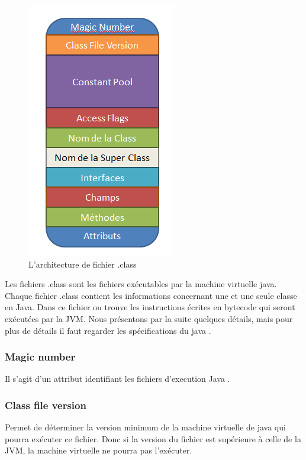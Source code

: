 \documentclass[12pt, a4paper, one side]{article}
\begin{document}
    \begin{figure}[h]
        \centering
        \includegraphics[scale=0.80]{JavaInternal.png}
        \caption{L'architecture de fichier .class \cite{ref_DexFormatvsJavabytecode}}
        \label{fig1}
    \end{figure}


    Les fichiers .class sont les fichiers exécutables par la machine virtuelle java. Chaque fichier .class contient les informations concernant une et une seule classe en Java. Dans ce fichier on trouve les instructions écrites en bytecode qui seront exécutées par la JVM. Nous présentons par la suite quelques détails, mais pour plus de détails il faut regarder les spécifications du java \cite{ref_specifications_java} .

    \subsubsection{Magic number}
    Il s'agit d'un attribut identifiant les fichiers d'execution Java \cite{ref_DexFormatvsJavabytecode}.

    \subsubsection{Class file version}
    Permet de déterminer la version minimum de la machine virtuelle de java qui pourra exécuter ce fichier. Donc si la version du fichier est supérieure à celle de la JVM, la machine virtuelle ne pourra pas l'exécuter.
\end{document}
